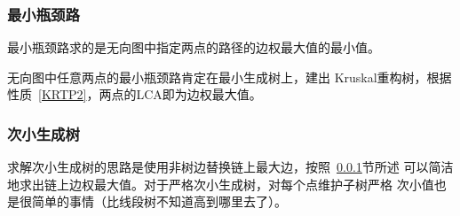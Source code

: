 \subsubsection{最小瓶颈路}\label{MBP}
最小瓶颈路求的是无向图中指定两点的路径的边权最大值的最小值。

无向图中任意两点的最小瓶颈路肯定在最小生成树上，建出
Kruskal重构树，根据性质~\ref{KRTP2}，两点的LCA即为边权最大值。

\subsubsection{次小生成树}
求解次小生成树的思路是使用非树边替换链上最大边，按照~\ref{MBP}节所述
可以简洁地求出链上边权最大值。对于严格次小生成树，对每个点维护子树严格
次小值也是很简单的事情（比线段树不知道高到哪里去了）。
